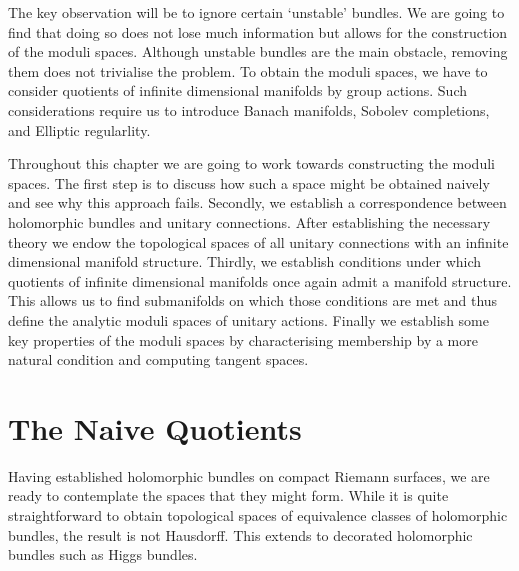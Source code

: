 \documentclass[12pt]{ociamthesis}  %
\begin{document}
The key observation will be to ignore certain `unstable' bundles. We
are going to find that doing so does not lose much information but
allows for the construction of the moduli spaces. Although unstable
bundles are the main obstacle, removing them does not trivialise the
problem. To obtain the moduli spaces, we have to consider quotients
of infinite dimensional manifolds by group actions. Such considerations
require us to introduce Banach manifolds, Sobolev completions, and
Elliptic regularlity.

Throughout this chapter we are going to work towards constructing
the moduli spaces.
The first step is to discuss how such a space might be obtained naively
and see why this approach fails. Secondly, we establish a correspondence
between holomorphic bundles and unitary connections. After establishing the necessary
theory we endow the topological spaces of all unitary connections
with an infinite dimensional manifold structure. Thirdly, we establish
conditions under which quotients of infinite dimensional manifolds
once again admit a manifold structure. This allows us to find submanifolds on which
those conditions are met and thus define the analytic moduli spaces of
unitary actions. Finally we establish some key properties of the
moduli spaces by characterising membership by a more natural
condition and computing tangent spaces.

\section{The Naive Quotients}

Having established holomorphic bundles on compact Riemann surfaces,
we are ready to contemplate the spaces that they might form. While it is
quite straightforward to obtain topological spaces of equivalence
classes of holomorphic bundles, the result is not Hausdorff.
This extends to decorated holomorphic bundles such as Higgs bundles.
\end{document}
